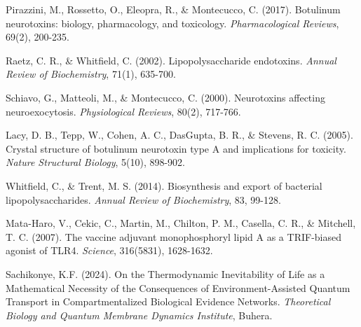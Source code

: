 \documentclass[11pt,a4paper]{article}
\begin{document}
\begin{thebibliography}{99}

Pirazzini, M., Rossetto, O., Eleopra, R., \& Montecucco, C. (2017). Botulinum neurotoxins: biology, pharmacology, and toxicology. \textit{Pharmacological Reviews}, 69(2), 200-235.

Raetz, C. R., \& Whitfield, C. (2002). Lipopolysaccharide endotoxins. \textit{Annual Review of Biochemistry}, 71(1), 635-700.

Schiavo, G., Matteoli, M., \& Montecucco, C. (2000). Neurotoxins affecting neuroexocytosis. \textit{Physiological Reviews}, 80(2), 717-766.

Lacy, D. B., Tepp, W., Cohen, A. C., DasGupta, B. R., \& Stevens, R. C. (2005). Crystal structure of botulinum neurotoxin type A and implications for toxicity. \textit{Nature Structural Biology}, 5(10), 898-902.

Whitfield, C., \& Trent, M. S. (2014). Biosynthesis and export of bacterial lipopolysaccharides. \textit{Annual Review of Biochemistry}, 83, 99-128.

Mata-Haro, V., Cekic, C., Martin, M., Chilton, P. M., Casella, C. R., \& Mitchell, T. C. (2007). The vaccine adjuvant monophosphoryl lipid A as a TRIF-biased agonist of TLR4. \textit{Science}, 316(5831), 1628-1632.

Sachikonye, K.F. (2024). On the Thermodynamic Inevitability of Life as a Mathematical Necessity of the Consequences of Environment-Assisted Quantum Transport in Compartmentalized Biological Evidence Networks. \textit{Theoretical Biology and Quantum Membrane Dynamics Institute}, Buhera.

\end{thebibliography}
\end{document}
